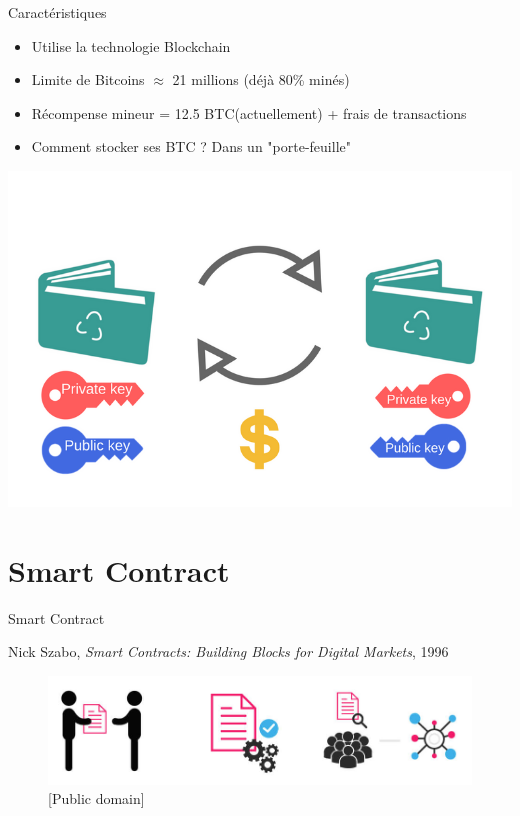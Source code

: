 \documentclass[xcolor=dvipsnames]{beamer}
\begin{document}
\begin{frame}{Caractéristiques}
	\begin{center}
		\begin{itemize}
			\item Utilise la technologie Blockchain
			\item Limite de Bitcoins $\approx$ 21 millions (déjà 80\% minés)
			\item Récompense mineur = 12.5 BTC(actuellement) + frais de transactions
			\item Comment stocker ses BTC ? Dans un "porte-feuille"
		\end{itemize}
	\end{center}
	\begin{center}
		\includegraphics[scale=0.15]{wallets.png}
	\end{center}
\end{frame}

\section{Smart Contract}

\begin{frame}{Smart Contract}
	
	
	\begin{center}
		Nick Szabo, \textit{Smart Contracts: Building Blocks for Digital Markets}, 1996
	\end{center}		
	
	\begin{figure}
		\centering
		\includegraphics[scale=.25]{smart_contract}
		\caption{[Public domain]}
	\end{figure}
	
	
\end{frame}
\end{document}

